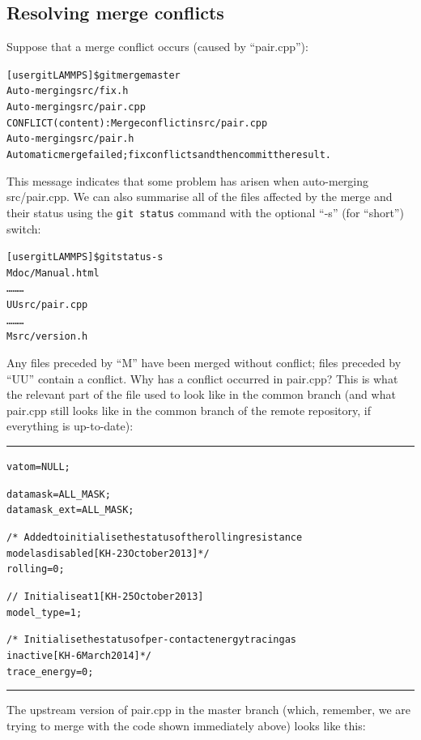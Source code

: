 \documentclass[a4paper,oneside,11pt]{article}
\begin{document}
\subsection{Resolving merge conflicts}\label{ssec:rmc}
Suppose that a merge conflict occurs (caused by ``pair.cpp''):
\begin{alltt}
[user gitLAMMPS]\$ git merge master
Auto-merging src/fix.h
Auto-merging src/pair.cpp
CONFLICT (content): Merge conflict in src/pair.cpp
Auto-merging src/pair.h
Automatic merge failed; fix conflicts and then commit the result.
\end{alltt}
This message indicates that some problem has arisen when auto-merging src/pair.cpp. We can also summarise all of the files affected by the merge and their status using the \texttt{git status} command with the optional ``-s'' (for ``short'') switch:
\begin{alltt}
[user gitLAMMPS]\$ git status -s
M  doc/Manual.html
\ldots\hspace*{10em}\ldots\hspace*{10em}\ldots
UU src/pair.cpp
\ldots\hspace*{10em}\ldots\hspace*{10em}\ldots
M  src/version.h
\end{alltt}
Any files preceded by ``M'' have been merged without conflict; files preceded by ``UU'' contain a conflict. Why has a conflict occurred in pair.cpp? This is what the relevant part of the file used to look like in the common branch (and what pair.cpp still looks like in the common branch of the remote repository, if everything is up-to-date):

\noindent\textcolor{customblue}{\rule{8cm}{0.8pt}}
\begin{alltt}
  vatom = NULL;

  datamask = ALL_MASK;
  datamask_ext = ALL_MASK;

  /*~ Added to initialise the status of the rolling resistance
    model as disabled [KH - 23 October 2013]*/
  rolling = 0;

  //~ Initialise at 1 [KH - 25 October 2013]
  model_type = 1;

  /*~ Initialise the status of per-contact energy tracing as
    inactive [KH - 6 March 2014]*/
  trace_energy = 0;
\end{alltt}
\noindent\textcolor{customblue}{\rule{8cm}{0.8pt}}

The upstream version of pair.cpp in the master branch (which, remember, we are trying to merge with the code shown immediately above) looks like this:
\end{document}
